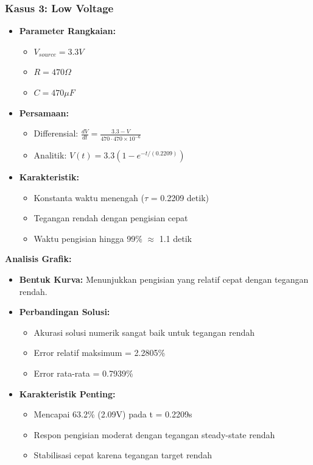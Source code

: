 \documentclass[conference]{IEEEtran}
\begin{document}
\subsubsection{Kasus 3: Low Voltage}
\begin{itemize}
\item \textbf{Parameter Rangkaian:}
  \begin{itemize}
  \item $V_{source} = 3.3V$
  \item $R = 470\Omega$
  \item $C = 470\mu F$
  \end{itemize}
\item \textbf{Persamaan:}
  \begin{itemize}
  \item Differensial: $\frac{dV}{dt} = \frac{3.3 - V}{470 \cdot 470\times10^{-6}}$
  \item Analitik: $V(t) = 3.3(1 - e^{-t/(0.2209)})$
  \end{itemize}
\item \textbf{Karakteristik:}
  \begin{itemize}
  \item Konstanta waktu menengah ($\tau$ = 0.2209 detik)
  \item Tegangan rendah dengan pengisian cepat
  \item Waktu pengisian hingga 99\% $\approx$ 1.1 detik
  \end{itemize}
\end{itemize}

\textbf{Analisis Grafik:}
\begin{itemize}
\item \textbf{Bentuk Kurva:} Menunjukkan pengisian yang relatif cepat dengan tegangan rendah.
\item \textbf{Perbandingan Solusi:}
  \begin{itemize}
  \item Akurasi solusi numerik sangat baik untuk tegangan rendah
  \item Error relatif maksimum = 2.2805\%
  \item Error rata-rata = 0.7939\%
  \end{itemize}
\item \textbf{Karakteristik Penting:}
  \begin{itemize}
  \item Mencapai 63.2\% (2.09V) pada t = 0.2209s
  \item Respon pengisian moderat dengan tegangan steady-state rendah
  \item Stabilisasi cepat karena tegangan target rendah
  \end{itemize}
\end{itemize}
\end{document}
